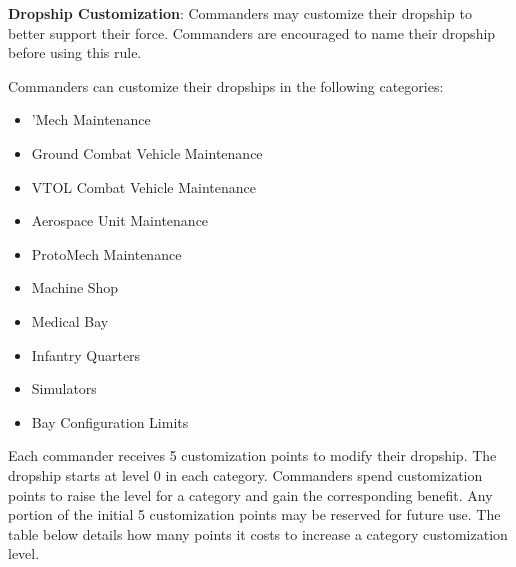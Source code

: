 \item {\bfseries Dropship Customization}: Commanders may customize their dropship to better support their force.
Commanders are encouraged to name their dropship before using this rule.

Commanders can customize their dropships in the following categories:


\begin{itemize}

\item 'Mech Maintenance

\item Ground Combat Vehicle Maintenance

\item VTOL Combat Vehicle Maintenance

\item Aerospace Unit Maintenance

\item ProtoMech Maintenance

\item Machine Shop

\item Medical Bay

\item Infantry Quarters

\item Simulators

\item Bay Configuration Limits

\end{itemize}


Each commander receives 5 customization points to modify their dropship.
The dropship starts at level 0 in each category.
Commanders spend customization points to raise the level for a category and gain the corresponding benefit.
Any portion of the initial 5 customization points may be reserved for future use.
The table below details how many points it costs to increase a category customization level.

